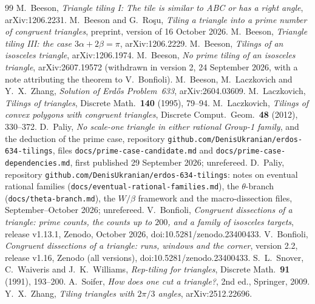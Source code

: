 \documentclass[11pt,reqno]{amsart}
\theoremstyle{plain}
\theoremstyle{definition}
\begin{document}
\begin{thebibliography}{99}
 M.~Beeson, \emph{Triangle tiling I: The tile is similar to ABC or has a right angle}, arXiv:1206.2231.
 M.~Beeson and G.~Ro\c{s}u, \emph{Tiling a triangle into a prime number of congruent triangles}, preprint, version of 16 October 2026.
 M.~Beeson, \emph{Triangle tiling III: the case $3\alpha+2\beta=\pi$}, arXiv:1206.2229.
 M.~Beeson, \emph{Tilings of an isosceles triangle}, arXiv:1206.1974.
 M.~Beeson, \emph{No prime tiling of an isosceles triangle}, arXiv:2607.19572 (withdrawn in version 2, 24 September 2026, with a note attributing the theorem to V.~Bonfioli).
 M.~Beeson, M.~Laczkovich and Y.~X.~Zhang, \emph{Solution of Erd\H{o}s Problem~633}, arXiv:2604.03609.
 M.~Laczkovich, \emph{Tilings of triangles}, Discrete Math.\ \textbf{140} (1995), 79--94.
 M.~Laczkovich, \emph{Tilings of convex polygons with congruent triangles}, Discrete Comput.\ Geom.\ \textbf{48} (2012), 330--372.
 D.~Paliy, \emph{No scale-one triangle in either rational Group-1 family}, and the deduction of the prime case, repository \texttt{github.com/DenisUkranian/erdos-634-tilings}, files \texttt{docs/prime-case-candidate.md} and \texttt{docs/prime-case-dependencies.md}, first published 29 September 2026; unrefereed.
 D.~Paliy, repository \texttt{github.com/DenisUkranian/erdos-634-tilings}: notes on eventual rational families (\texttt{docs/eventual-rational-families.md}), the $\theta$-branch (\texttt{docs/theta-branch.md}), the $W/\beta$ framework and the macro-dissection files, September--October 2026; unrefereed.
 V.~Bonfioli, \emph{Congruent dissections of a triangle: prime counts, the counts up to $200$, and a family of isosceles targets}, release v1.13.1, Zenodo, October 2026, doi:10.5281/zenodo.23400433.
 V.~Bonfioli, \emph{Congruent dissections of a triangle: runs, windows and the corner}, version 2.2, release v1.16, Zenodo (all versions), doi:10.5281/zenodo.23400433.
 S.~L.~Snover, C.~Waiveris and J.~K.~Williams, \emph{Rep-tiling for triangles}, Discrete Math.\ \textbf{91} (1991), 193--200.
 A.~Soifer, \emph{How does one cut a triangle?}, 2nd ed., Springer, 2009.
 Y.~X.~Zhang, \emph{Tiling triangles with $2\pi/3$ angles}, arXiv:2512.22696.
\end{thebibliography}
\end{document}
